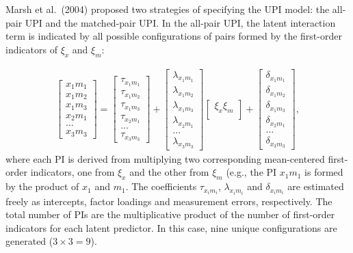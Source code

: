 \documentclass[
  man]{apa7}
\begin{document}
Marsh et al.~(2004) proposed two strategies of specifying the UPI model: the all-pair UPI and the matched-pair UPI. In the all-pair UPI, the latent interaction term is indicated by all possible configurations of pairs formed by the first-order indicators of \(\xi_{x}\) and \(\xi_m\):

\begin{align}
    \begin{bmatrix}
        x_{1}m_{1} \\
        x_{1}m_{2} \\
        x_{1}m_{3} \\ 
        x_{2}m_{1} \\
        ... \\
        x_{3}m_{3}
    \end{bmatrix} = 
    \begin{bmatrix}
        \tau_{x_{1}m_{1}} \\
        \tau_{x_{1}m_{2}} \\ 
        \tau_{x_{1}m_{3}} \\ 
        \tau_{x_{2}m_{1}} \\ 
        ...\\
        \tau_{x_{3}m_{3}} 
    \end{bmatrix} +
    \begin{bmatrix}
        \lambda_{x_{1}m_{1}} \\
        \lambda_{x_{1}m_{2}} \\ 
        \lambda_{x_{1}m_{3}} \\ 
        \lambda_{x_{2}m_{1}} \\ 
        ...\\
        \lambda_{x_{3}m_{3}}
    \end{bmatrix}
    \begin{bmatrix}
        \xi_{x}\xi_{m} \\
    \end{bmatrix} +
    \begin{bmatrix}
        \delta_{x_{1}m_{1}} \\
        \delta_{x_{1}m_{2}} \\ 
        \delta_{x_{1}m_{3}} \\
        \delta_{x_{2}m_{1}} \\
        ... \\
        \delta_{x_{3}m_{3}}
    \end{bmatrix},
\end{align}
where each PI is derived from multiplying two corresponding mean-centered first-order indicators, one from \(\xi_{x}\) and the other from \(\xi_{m}\) (e.g., the PI \(x_{1}m_{1}\) is formed by the product of \(x_{1}\) and \(m_{1}\). The coefficients \({\tau_{x_{i}m_{i}}}\), \({\lambda_{x_{i}m_{i}}}\) and \({\delta_{x_{i}m_{i}}}\) are estimated freely as intercepts, factor loadings and measurement errors, respectively. The total number of PIs are the multiplicative product of the number of first-order indicators for each latent predictor. In this case, nine unique configurations are generated (\(3 \times 3 = 9\)).
\end{document}
